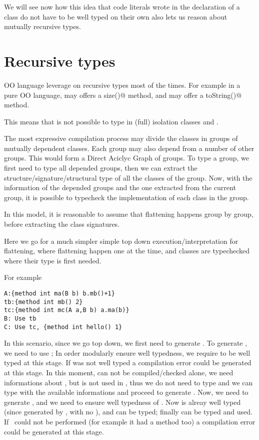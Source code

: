 We will see now how this idea that code literals wrote in the declaration of a class
do not have to be well typed on their own also lets us reason about mutually recursive types.

 \section{Recursive types}

OO language leverage on recursive types most of the times.
For example in a pure OO language, \Q@String@ may offers a \Q@Int size()@
method, and \Q@Int@ may offer a \Q@String toString()@ method.

This means that is not possible to type in (full) isolation classes
\Q@String@ and \Q@Int@.

The most expressive compilation process may divide the classes in groups of mutually 
dependent classes.
Each group may also depend from a number of other groups.
This would form a Direct Aciclyc Graph of groups.
To type a group, we first need to type all depended groups, then
we can extract the structure/signature/structural type of all
the classes of the group.
Now, with the information of the depended groups and the one extracted
from the current group, it is possible to typecheck the implementation
 of each class in the group.

In this model, it is reasonable to assume that flattening happens group by group, before
extracting the class signatures.

Here we go for a much simpler simple top down execution/interpretation for flattening, where flattening
happen one at the time, and classes are typechecked where their type is first needed.

For example
\begin{lstlisting}
A:{method int ma(B b) b.mb()+1}
tb:{method int mb() 2}
tc:{method int mc(A a,B b) a.ma(b)}
B: Use tb
C: Use tc, {method int hello() 1}
\end{lstlisting}
In this scenario, since we go top down, we first need to generate \Q@B@.
To generate \Q@B@, we need to use \Q@tb@;
In order modularly ensure well typedness,
we require \Q@tb@ to be well typed at this stage. If \Q@tb@ was not well typed
a compilation error could be generated at this stage.
In this moment, \Q@A@ can not be compiled/checked alone,
we need informations about \Q@B@, but \Q@A@ is not used in \Q@tb@,
thus we do not need to type \Q@A@ and we can type \Q@tb@ with
 the available informations and proceed to generate \Q@B@.
Now, we need to generate \Q@C@, and we need to ensure well typedness of \Q@tc@.
Now \Q@B@ is alreay well typed (since generated by \use \Q@tb@, with no \mL),
and \Q@A@ can be typed;  finally \Q@tc@ can be typed and used.
If \use\ could not be performed (for example it \Q@tc@ had a method \Q@hello@ too)
a compilation error could be generated at this stage.

